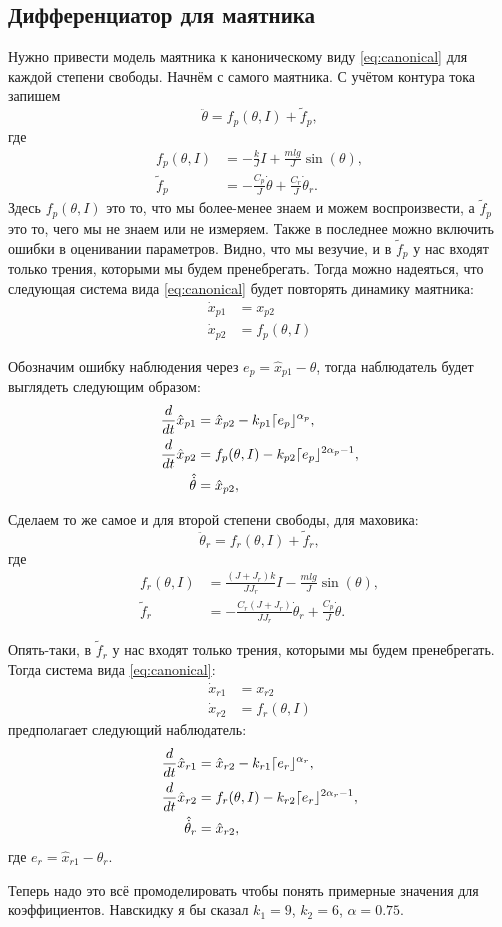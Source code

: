 \documentclass{article}
\DeclarePairedDelimiter{\homd}{\lceil}{\rfloor}
\begin{document}
\subsection{Дифференциатор для маятника}
Нужно привести модель маятника к каноническому виду \eqref{eq:canonical} для каждой степени свободы. Начнём с самого маятника. С учётом контура тока запишем
\[
	\ddot{\theta} = f_p(\theta,I) + \tilde{f}_p,
\]
где 
\[
	\begin{aligned}
		f_p(\theta,I) &= -\frac{k}{J}I + \frac{mlg}{J}\sin(\theta), \\ 
		\tilde{f}_p &= -\frac{C_p}{J}\dot{\theta} + \frac{C_r}{J}\dot{\theta}_r. 	
	\end{aligned}
\]
Здесь $f_p(\theta,I)$ это то, что мы более-менее знаем и можем воспроизвести, а $\tilde{f}_p$ это то, чего мы не знаем или не измеряем. 
Также в последнее можно включить ошибки в оценивании параметров. 
Видно, что мы везучие, и в $\tilde{f}_p$ у нас входят только трения, которыми мы будем пренебрегать.
Тогда можно надеяться, что следующая система вида \eqref{eq:canonical} будет повторять динамику маятника:
\begin{align*}
\dot{x}_{p1} &= x_{p2}\\
\dot{x}_{p2} &= f_p(\theta, I)
\end{align*}

Обозначим ошибку наблюдения через $e_p = \hat{x}_{p 1} - \theta$, тогда наблюдатель будет выглядеть следующим образом:
\[
	\begin{aligned}
		\frac{d}{dt}\hat{x}_{p 1} &= \hat{x}_{p 2} - k_{p 1}\homd{e_p}^{\alpha_p}, \\
		\frac{d}{dt}\hat{x}_{p 2} &= f_p(\theta,I) - k_{p 2}\homd{e_p}^{2\alpha_p-1}, \\
		\hat{\dot{\theta}} &= \hat{x}_{p2},
	\end{aligned}
\]

Сделаем то же самое и для второй степени свободы, для маховика:
\[
	\ddot{\theta}_r = f_r(\theta,I) + \tilde{f}_r,
\]
где 
\[
	\begin{aligned}
		f_r(\theta,I) &= \frac{(J+J_r)k}{JJ_r}I - \frac{mlg}{J}\sin(\theta), \\ 
		\tilde{f}_r &= -\frac{C_r(J+J_r)}{JJ_r}\dot{\theta}_r + \frac{C_p}{J}\dot{\theta}. 	
	\end{aligned}
\]

Опять-таки, в $\tilde{f}_r$ у нас входят только трения, которыми мы будем пренебрегать. Тогда система вида  \eqref{eq:canonical}:
\begin{align*}
\dot{x}_{r1} &= x_{r2}\\
\dot{x}_{r2} &= f_r(\theta, I)
\end{align*}
предполагает следующий наблюдатель:
\[
\begin{aligned}
	\frac{d}{dt}\hat{x}_{r 1} &= \hat{x}_{r 2} - k_{r 1}\homd{e_r}^{\alpha_r}, \\
	\frac{d}{dt}\hat{x}_{r 2} &= f_r(\theta,I) - k_{r 2}\homd{e_r}^{2\alpha_r-1}, \\
	\hat{\dot{\theta}}_r &= \hat{x}_{r2},
\end{aligned}
\]
где $e_r = \hat{x}_{r 1}  - \theta_r$.

Теперь надо это всё промоделировать чтобы понять примерные значения для коэффициентов. Навскидку я бы сказал $k_1=9$, $k_2=6$, $\alpha=0.75$. 
\end{document}
